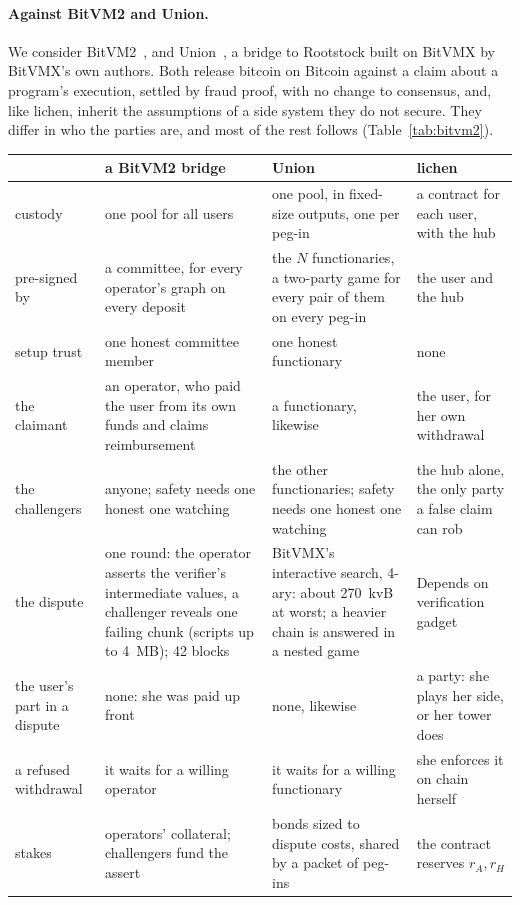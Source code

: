 \documentclass[11pt]{article}
\begin{document}
\paragraph{Against BitVM2 and Union.} We consider BitVM2~\cite{bitvm2usenix}, and
Union~\cite{union}, a bridge to Rootstock built on BitVMX by BitVMX's
own authors. Both release bitcoin on Bitcoin against a claim about
a program's execution, settled by fraud proof, with no change to
consensus, and, like lichen, inherit the assumptions of a side system they
do not secure. They differ in who the parties are, and most of the rest
follows (Table~\ref{tab:bitvm2}).

\begin{table}[!tp]
\centering
\small
\begin{tabularx}{\linewidth}{>{\raggedright\arraybackslash}p{21mm}LLL}
\toprule
& a BitVM2 bridge & Union & lichen \\
\midrule
custody & one pool for all users & one pool, in fixed-size outputs, one per peg-in & a contract for each user, with the hub \\
pre-signed by & a committee, for every operator's graph on every deposit & the $N$ functionaries, a two-party game for every pair of them on every peg-in & the user and the hub \\
setup trust & one honest committee member & one honest functionary & none \\
the claimant & an operator, who paid the user from its own funds and claims reimbursement & a functionary, likewise & the user, for her own withdrawal \\
the challengers & anyone; safety needs one honest one watching & the other functionaries; safety needs one honest one watching & the hub alone, the only party a false claim can rob \\
the dispute & one round: the operator asserts the verifier's intermediate values, a challenger reveals one failing chunk (scripts up to 4~MB); 42 blocks & BitVMX's interactive search, 4-ary: about 270~kvB at worst; a heavier chain is answered in a nested game & Depends on verification gadget \\
the user's part in a dispute & none: she was paid up front & none, likewise & a party: she plays her side, or her tower does \\
a refused withdrawal & it waits for a willing operator & it waits for a willing functionary & she enforces it on chain herself \\
stakes & operators' collateral; challengers fund the assert & bonds sized to dispute costs, shared by a packet of peg-ins & the contract reserves $r_A, r_H$ \\

\end{tabularx}
\end{table}
\end{document}
